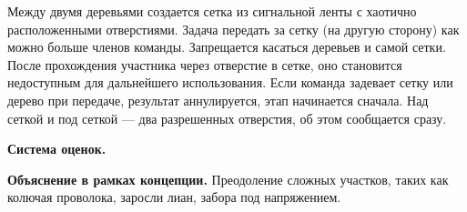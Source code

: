 
\par Между двумя деревьями создается сетка из сигнальной ленты с хаотично расположенными отверстиями. Задача передать за сетку (на другую сторону) как можно больше членов команды. Запрещается касаться деревьев и самой сетки. После прохождения участника через отверстие в сетке, оно становится недоступным для дальнейшего использования. Если команда задевает сетку или дерево при передаче, результат аннулируется, этап начинается сначала. Над сеткой и под сеткой --- два разрешенных отверстия, об этом сообщается сразу.

\par \textbf{Система оценок.}

\par \textbf{Объяснение в рамках концепции.} Преодоление сложных участков, таких как колючая проволока, заросли лиан, забора под напряжением.